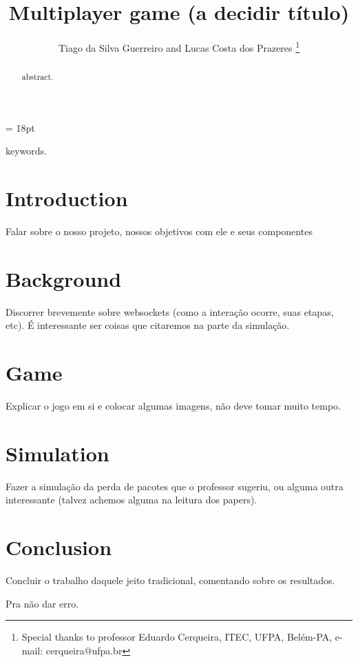 \documentclass[english]{sbrt}
\begin{document}
\title{Multiplayer game (a decidir título)}

\author{Tiago da Silva Guerreiro and Lucas Costa dos Prazeres
    \thanks{Special thanks to professor Eduardo Cerqueira, ITEC, UFPA, Belém-PA, e-mail: cerqueira@ufpa.br}%
}

\maketitle

\baselineskip = 18pt


\begin{abstract}
    abstract.
\end{abstract}
\begin{keywords}
    keywords.
\end{keywords}

\section{\textbf{Introduction}}
Falar sobre o nosso projeto, nossos objetivos com ele e seus componentes

\section{\textbf{Background}}
Discorrer brevemente sobre websockets (como a interação ocorre, suas etapas, etc). É interessante ser coisas que citaremos na parte da simulação.

\section{\textbf{Game}}
Explicar o jogo em si e colocar algumas imagens, não deve tomar muito tempo.

\section{\textbf{Simulation}}
Fazer a simulação da perda de pacotes que o professor sugeriu, ou alguma outra interessante (talvez achemos alguma na leitura dos papers).

\section{\textbf{Conclusion}}
Concluir o trabalho daquele jeito tradicional, comentando sobre os resultados.

\cite{maodv01} Pra não dar erro.



\end{document}
